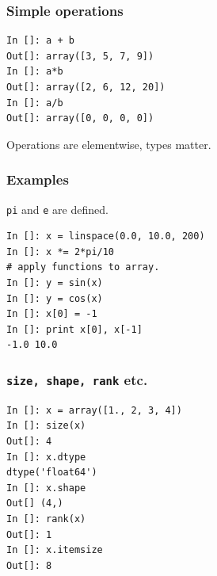 \documentclass[14pt,compress]{beamer}
\newcommand{\typ}[1]{\lstinline{#1}}
\begin{document}


\begin{frame}[fragile]
  \frametitle{Simple operations}
\begin{lstlisting}
In []: a + b  
Out[]: array([3, 5, 7, 9])
In []: a*b
Out[]: array([2, 6, 12, 20])
In []: a/b
Out[]: array([0, 0, 0, 0])
\end{lstlisting}
Operations are elementwise, types matter.
\end{frame}

\begin{frame}[fragile]
  \frametitle{Examples}
\noindent \typ{pi} and \typ{e} are defined.
\begin{lstlisting}
In []: x = linspace(0.0, 10.0, 200)
In []: x *= 2*pi/10
# apply functions to array.
In []: y = sin(x)
In []: y = cos(x)
In []: x[0] = -1
In []: print x[0], x[-1]
-1.0 10.0
\end{lstlisting}
\end{frame}

\begin{frame}[fragile]
    \frametitle{\typ{size, shape, rank} etc.}
\vspace*{-8pt}
\begin{lstlisting}
In []: x = array([1., 2, 3, 4])
In []: size(x)
Out[]: 4
In []: x.dtype
dtype('float64')
In []: x.shape
Out[] (4,)
In []: rank(x)
Out[]: 1
In []: x.itemsize
Out[]: 8
\end{lstlisting}
\end{frame}
\end{document}
